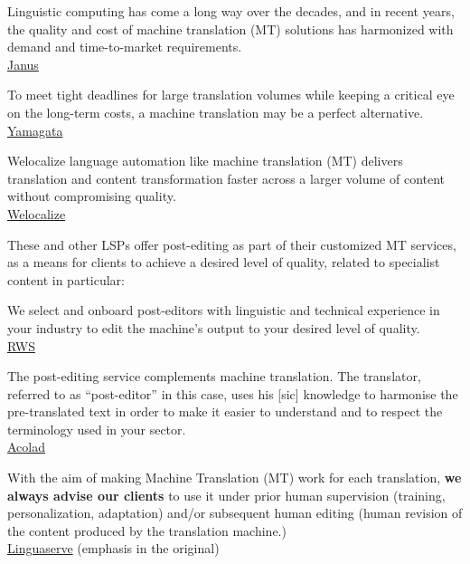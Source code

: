 \documentclass[output=paper,colorlinks,citecolor=brown]{langsci/langscibook}
\begin{document}
\begin{modquote}
Linguistic computing has come a long way over the decades, and in recent years, the quality and cost of machine translation (MT) solutions has harmonized with demand and time-to-market requirements.\\
\href{https://janusww.com/technology/mtmtpe/}{Janus} 
\end{modquote}

\begin{modquote}
To meet tight deadlines for large translation volumes while keeping a critical eye on the long-term costs, a machine translation may be a perfect alternative. \\
\href{https://www.yamagata-europe.com/en-gb/translation/machine-translation}{Yamagata}
\end{modquote}

\begin{modquote}
Welocalize language automation like machine translation (MT) delivers translation and content transformation faster across a larger volume of content without compromising quality. \\
\href{https://www.welocalize.com/content-transformation/}{Welocalize}
\end{modquote}

These and other LSPs offer post-editing as part of their customized MT services, as a means for clients to achieve a desired level of quality, related to specialist content in particular: 

\begin{modquote}
We select and onboard post-editors with linguistic and technical experience in your industry to edit the machine’s output to your desired level of quality.\\
\href{https://www.rws.com/technology/machine-translation/}{RWS} 
\end{modquote}

\begin{modquote}
The post-editing service complements machine translation. The translator, referred to as \enquote{post-editor} in this case, uses his [sic] knowledge to harmonise the pre-translated text in order to make it easier to understand and to respect the terminology used in your sector. \\
\href{https://www.acolad.com/uk/services/}{Acolad}
\end{modquote}

\begin{modquote}
With the aim of making Machine Translation (MT) work for each translation, \textbf{we always advise our clients} to use it under prior human supervision (training, personalization, adaptation) and/or subsequent human editing (human revision of the content produced by the translation machine.)\\
\href{https://www.linguaserve.com/en/multilingual-services/machine-translation-and-human-post-editing/}{Linguaserve} (emphasis in the original)
\end{modquote}
\end{document}
